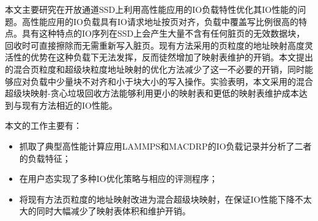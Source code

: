 \begin{cabstract}
  本文主要研究在开放通道SSD上利用高性能应用的IO负载特性优化其IO性能的问题。高性能应用的IO负载具有IO请求地址按页对齐，负载中覆盖写比例很高的特点。具有这种特点的IO序列在SSD上会产生大量不含有任何脏页的无效数据块，回收时可直接擦除而无需重新写入脏页。现有方法采用的页粒度的地址映射高度灵活性的优势在这种负载下无法发挥，反而徒然增加了映射表维护的开销。本文提出的混合页粒度和超级块粒度地址映射的优化方法减少了这一不必要的开销，同时能够应对负载中少量块不对齐和小于块大小的写入操作。实验表明，本文采用的混合超级块映射-贪心垃圾回收方法能够利用更小的映射表和更低的映射表维护成本达到与现有方法相近的IO性能。

  本文的工作主要有：
  \begin{itemize}
    \item 抓取了典型高性能计算应用LAMMPS和MACDRP的IO负载记录并分析了二者的负载特征；
    \item 在用户态实现了多种IO优化策略与相应的评测程序；
    \item 将现有方法页粒度的地址映射改进为混合超级块映射，在保证IO性能下降不太大的同时大幅减少了映射表体积和维护开销。
  \end{itemize}
\end{cabstract}


